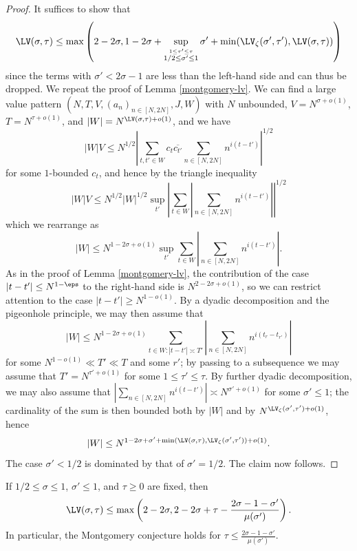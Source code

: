 \begin{proof} It suffices to show that
    $$ \LV(\sigma,\tau) \leq \max\left(2-2\sigma, 1 - 2\sigma + \sup_{\stackrel{1 \leq \tau' \leq \tau}{1/2 \leq \sigma' \leq 1}}  \sigma' + \min(\LV_\zeta(\sigma',\tau'), \LV(\sigma,\tau)) \right)$$
    since the terms with $\sigma' < 2\sigma-1$ are less than the left-hand side and can thus be dropped.
    We repeat the proof of Lemma \ref{montgomery-lv}.  We can find a large value pattern $(N,T,V,(a_n)_{n \in [N,2N]},J,W)$ with $N$ unbounded, $V = N^{\sigma+o(1)}$, $T = N^{\tau+o(1)}$, and $|W| = N^{\LV(\sigma,\tau)+o(1)}$, and we have
    $$ |W|V \leq N^{1/2} \left|\sum_{t,t' \in W} c_t \overline{c_{t'}} \sum_{n \in [N,2N]} n^{i(t-t')} \right|^{1/2}$$
    for some $1$-bounded $c_t$, and hence by the triangle inequality
    $$ |W|V \leq N^{1/2} |W|^{1/2} \sup_{t'} \left|\sum_{t \in W} |\sum_{n \in [N,2N]} n^{i(t-t')}| \right|^{1/2}$$
    which we rearrange as
    $$ |W| \leq N^{1-2\sigma+o(1)} \sup_{t'} \sum_{t \in W} |\sum_{n \in [N,2N]} n^{i(t-t')}|.$$
    As in the proof of Lemma \ref{montgomery-lv}, the contribution of the case $|t - t'| \leq N^{1-\eps}$ to the right-hand side is $N^{2-2\sigma+o(1)}$, so we can restrict attention to the case $|t - t'| \geq N^{1-o(1)}$.  By a dyadic decomposition and the pigeonhole principle, we may then assume that
    $$ |W| \leq N^{1-2\sigma+o(1)} \sum_{t \in W: |t - t'| \asymp T'} |\sum_{n \in [N,2N]} n^{i(t_r-t_{r'})}|$$
    for some $N^{1-o(1)} \ll T' \ll T$ and some $r'$; by passing to a subsequence we may assume that $T' = N^{\tau'+o(1)}$ for some $1 \leq \tau' \leq \tau$.  By further dyadic decomposition, we may also assume that
    $ |\sum_{n \in [N,2N]} n^{i(t-t')}| \asymp N^{\sigma'+o(1)}$
    for some $\sigma' \leq 1$; the cardinality of the sum is then bounded both by $|W|$ and by $N^{\LV_\zeta(\sigma',\tau') + o(1)}$,
    hence
    $$ |W| \leq N^{1-2\sigma+\sigma' + \min( \LV(\sigma,\tau), \LV_\zeta(\sigma',\tau') ) + o(1)}.$$
    The case $\sigma' < 1/2$ is dominated by that of $\sigma'=1/2$.  The claim now follows.
\end{proof}

\begin{corollary}\label{mu-lv}  If $1/2 \leq \sigma \leq 1$, $\sigma' \leq 1$, and $\tau \geq 0$ are fixed, then
    $$\LV(\sigma,\tau) \leq \max\left( 2-2\sigma, 2 - 2\sigma + \tau - \frac{2\sigma-1-\sigma'}{\mu(\sigma')} \right).$$
    In particular, the Montgomery conjecture holds for $\tau \leq \frac{2\sigma-1-\sigma'}{\mu(\sigma')}$.
\end{corollary}

